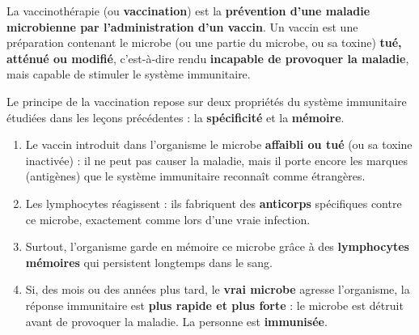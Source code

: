 \documentclass[11pt]{article}
\newcommand{\cle}[1]{{\popxbold\color{popdark}#1}}
\begin{document}
\begin{definition}[La vaccinothérapie]
La \cle{vaccinothérapie} (ou \textbf{vaccination}) est la \textbf{prévention d'une maladie microbienne par l'administration d'un vaccin}. Un \cle{vaccin} est une préparation contenant le microbe (ou une partie du microbe, ou sa toxine) \textbf{tué, atténué ou modifié}, c'est-à-dire rendu \textbf{incapable de provoquer la maladie}, mais capable de stimuler le système immunitaire.
\end{definition}

Le principe de la vaccination repose sur deux propriétés du système immunitaire étudiées dans les leçons précédentes : la \textbf{spécificité} et la \textbf{mémoire}.

\begin{enumerate}
\item Le vaccin introduit dans l'organisme le microbe \textbf{affaibli ou tué} (ou sa toxine inactivée) : il ne peut pas causer la maladie, mais il porte encore les marques (antigènes) que le système immunitaire reconnaît comme étrangères.
\item Les lymphocytes réagissent : ils fabriquent des \textbf{anticorps} spécifiques contre ce microbe, exactement comme lors d'une vraie infection.
\item Surtout, l'organisme garde en mémoire ce microbe grâce à des \textbf{lymphocytes mémoires} qui persistent longtemps dans le sang.
\item Si, des mois ou des années plus tard, le \textbf{vrai microbe} agresse l'organisme, la réponse immunitaire est \textbf{plus rapide et plus forte} : le microbe est détruit avant de provoquer la maladie. La personne est \textbf{immunisée}.
\end{enumerate}
\end{document}
